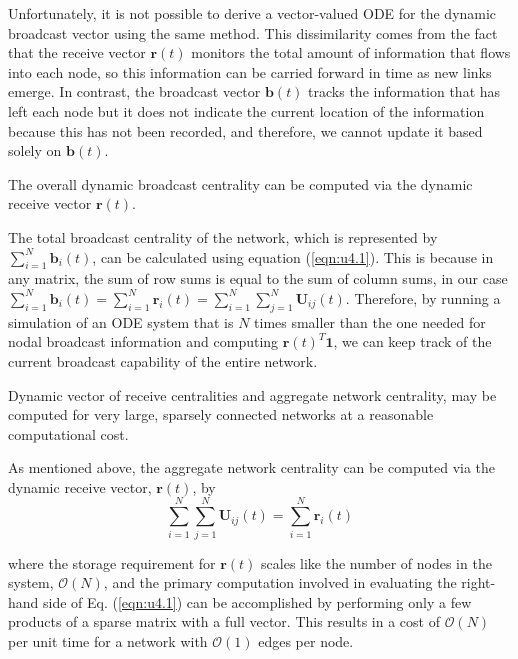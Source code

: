 Unfortunately, it is not possible to derive a vector-valued ODE for the dynamic broadcast vector using the same method. This dissimilarity comes from the fact that the receive vector $\mathbf{r}(t)$ monitors the total amount of information that flows into each node, so this information can be carried forward in time as new links emerge. In contrast, the broadcast vector $\mathbf{b}(t)$ tracks the information that has left each node but it does not indicate the current location of the information because this has not been recorded, and therefore, we cannot update it based solely on $\mathbf{b}(t)$.

\begin{highlightedParagraphC}
 
The overall dynamic broadcast centrality can be computed via the dynamic receive vector $\mathbf{r}(t)$.

\end{highlightedParagraphC}

The total broadcast centrality of the network, which is represented by $\sum_{i=1}^{N} \mathbf{b}_i(t)$, can be calculated using equation (\ref{eqn:u4.1}). This is because in any matrix, the sum of row sums is equal to the sum of column sums, in our case $\sum_{i=1}^{N} \mathbf{b}_i(t) = \sum_{i=1}^{N} \mathbf{r}_i(t)=\sum_{i=1}^{N}\sum_{j=1}^{N} \mathbf{U}_{ij}(t)$. Therefore, by running a simulation of an ODE system that is $N$ times smaller than the one needed for nodal broadcast information and computing $\mathbf{r}(t)^T\mathbf{1}$, we can keep track of the current broadcast capability of the entire network.

\begin{highlightedParagraphC}
 
 Dynamic vector of receive centralities and aggregate network centrality, may be computed for very large, sparsely connected networks at a reasonable computational cost. 

\end{highlightedParagraphC}

As mentioned above, the aggregate network centrality can be computed via the dynamic receive vector, $\mathbf{r}(t)$, by $$\sum_{i=1}^{N}\sum_{j=1}^{N} \mathbf{U}_{ij}(t) = \sum_{i=1}^{N} \mathbf{r}_i(t)$$

where the storage requirement for $\mathbf{r}(t)$ scales like the number of nodes in the system, $\mathcal{O}(N)$, and the primary computation involved in evaluating the right-hand side of Eq. (\ref{eqn:u4.1}) can be accomplished by performing only a few products of a sparse matrix with a full vector. This results in a cost of $\mathcal{O}(N)$ per unit time for a network with $\mathcal{O}(1)$ edges per node.

